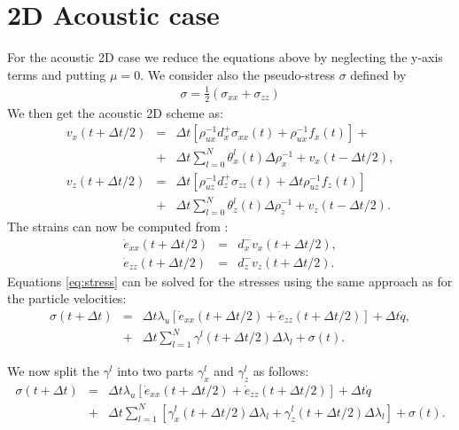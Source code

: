 \documentclass[11pt]{article}
\begin{document}
\section*{2D Acoustic case}
For the acoustic 2D case we reduce the equations above by neglecting 
the y-axis terms
and putting $\mu=0$.
We consider also the pseudo-stress $\sigma$ defined by
\begin{eqnarray*}
\sigma = \frac{1}{2}\left(\sigma_{xx} + \sigma_{zz}\right) 
\end{eqnarray*}
We then get the acoustic 2D scheme as:
\begin{eqnarray*}
v_x(t+\Delta t/2) & = & \Delta t\left[\rho_{ux}^{-1}d^+_x \sigma_{xx}(t)  
                         + \rho_{ux}^{-1}f_x(t)\right] +\nonumber\\
           & + & \Delta t \sum_{l=0}^N\theta^l_{x}(t)\Delta\rho^{-1}_{x}  
                   +v_x(t-\Delta t/2),\nonumber\\
v_z(t+\Delta t/2) & = & \Delta t \left[\rho_{uz}^{-1}d^+_z \sigma_{zz}(t) 
                        + \Delta t \rho_{uz}^{-1}f_z(t)\right]\nonumber\\  
           & + & \Delta t\sum_{l=0}^N\theta^l_{z}(t)\Delta \rho^{-1}_{z}
                       +v_z(t-\Delta t/2). 
\end{eqnarray*}
The strains can now be computed from :
\begin{eqnarray*}
    \dot{e}_{xx}(t+\Delta t/2) & = & d^-_x v_x(t+\Delta t/2), \\
    \dot{e}_{zz}(t+\Delta t/2) & = & d^-_z v_z(t+\Delta t/2). 
\end{eqnarray*}
%
Equations \eqref{eq:stress}   can be solved for the stresses using 
the same approach as for the particle velocities:
\begin{eqnarray*}
  \sigma(t+\Delta t) 
       & = & \Delta t\lambda_u \left [\dot{e}_{xx}(t+\Delta t/2) 
             +\dot{e}_{zz}(t+\Delta t/2)\right]\nonumber
             +\Delta t\dot{q} \nonumber,                       \\
       & + & \Delta t\sum_{l=1}^N\gamma^l(t+\Delta t/2)\Delta\lambda_l  
                           + \sigma(t).
\end{eqnarray*} 

We now split the $\gamma^l$ into two parts $\gamma^l_x$ and $\gamma^l_z$ 
as follows:
\begin{eqnarray*}
  \sigma(t+\Delta t) & = & \Delta t\lambda_u \left [\dot{e}_{xx}(t+\Delta t/2) 
                          +\dot{e}_{zz}(t+\Delta t/2)\right]\nonumber
                           +\Delta t\dot{q} \nonumber\\
                     & + & \Delta t
                 \sum_{l=1}^N\left[\gamma^l_{x}(t+\Delta t/2)\Delta\lambda_l  
                                                   +\gamma^l_{z}(t+\Delta t/2)\Delta\lambda_l  \right]
                           + \sigma(t).\\
\end{eqnarray*} 
\end{document}
